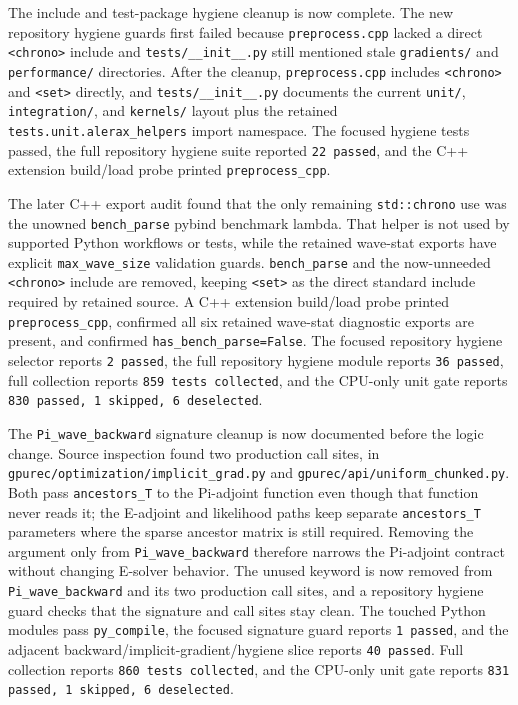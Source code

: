 \documentclass[11pt]{article}
\begin{document}
The include and test-package hygiene cleanup is now complete.  The new
repository hygiene guards first failed because \texttt{preprocess.cpp} lacked a
direct \texttt{<chrono>} include and \texttt{tests/\_\_init\_\_.py} still
mentioned stale \texttt{gradients/} and \texttt{performance/} directories.
After the cleanup, \texttt{preprocess.cpp} includes \texttt{<chrono>} and
\texttt{<set>} directly, and \texttt{tests/\_\_init\_\_.py} documents the
current \texttt{unit/}, \texttt{integration/}, and \texttt{kernels/} layout plus
the retained \texttt{tests.unit.alerax\_helpers} import namespace.  The focused
hygiene tests passed, the full repository hygiene suite reported
\texttt{22 passed}, and the C++ extension build/load probe printed
\texttt{preprocess\_cpp}.

The later C++ export audit found that the only remaining
\texttt{std::chrono} use was the unowned \texttt{bench\_parse} pybind benchmark
lambda.  That helper is not used by supported Python workflows or tests, while
the retained wave-stat exports have explicit \texttt{max\_wave\_size}
validation guards.  \texttt{bench\_parse} and the now-unneeded
\texttt{<chrono>} include are removed, keeping \texttt{<set>} as the direct
standard include required by retained source.  A C++ extension build/load probe
printed \texttt{preprocess\_cpp}, confirmed all six retained wave-stat
diagnostic exports are present, and confirmed \texttt{has\_bench\_parse=False}.
The focused repository hygiene selector reports \texttt{2 passed}, the full
repository hygiene module reports \texttt{36 passed}, full collection reports
\texttt{859 tests collected}, and the CPU-only unit gate reports
\texttt{830 passed, 1 skipped, 6 deselected}.

The \texttt{Pi\_wave\_backward} signature cleanup is now documented before the
logic change.  Source inspection found two production call sites, in
\texttt{gpurec/optimization/implicit\_grad.py} and
\texttt{gpurec/api/uniform\_chunked.py}.  Both pass \texttt{ancestors\_T} to
the Pi-adjoint function even though that function never reads it; the
E-adjoint and likelihood paths keep separate \texttt{ancestors\_T} parameters
where the sparse ancestor matrix is still required.  Removing the argument only
from \texttt{Pi\_wave\_backward} therefore narrows the Pi-adjoint contract
without changing E-solver behavior.  The unused keyword is now removed from
\texttt{Pi\_wave\_backward} and its two production call sites, and a repository
hygiene guard checks that the signature and call sites stay clean.  The touched
Python modules pass \texttt{py\_compile}, the focused signature guard reports
\texttt{1 passed}, and the adjacent backward/implicit-gradient/hygiene slice
reports \texttt{40 passed}.  Full collection reports \texttt{860 tests
collected}, and the CPU-only unit gate reports
\texttt{831 passed, 1 skipped, 6 deselected}.
\end{document}
